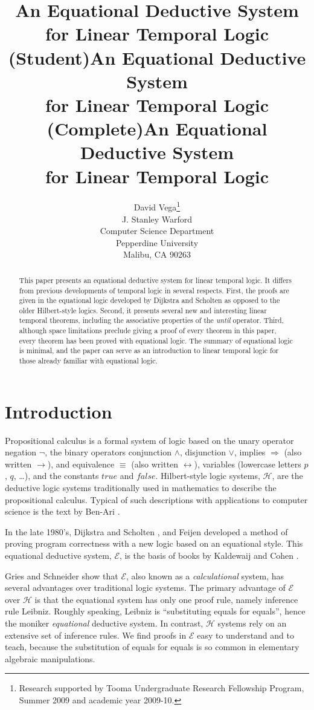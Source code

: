 \documentclass[12pt, fleqn, leqno]{article}
\title{An Equational Deductive System\\for Linear Temporal Logic (Student)}
\title{An Equational Deductive System\\for Linear Temporal Logic (Complete)}
\title{An Equational Deductive System\\for Linear Temporal Logic}
\author{David Vega\thanks{Research supported by Tooma Undergraduate Research Fellowship Program, Summer 2009
        and academic year 2009-10.}\\
   J. Stanley Warford\\
   Computer Science Department\\
   Pepperdine University\\
   Malibu, CA 90263}
\date{} %
\newcommand{\impl}{\ensuremath{\Rightarrow}}        %
\begin{document}
\maketitle
\begin{abstract}
This paper presents an equational deductive system for linear temporal logic.
It differs from previous developments of temporal logic in several respects.
First, the proofs are given in the equational logic developed by Dijkstra and Scholten as opposed to the older Hilbert-style logics.
Second, it presents several new and interesting linear temporal theorems, including the associative
properties of the \textit{until} operator.
Third, although space limitations preclude giving a proof of every theorem in this paper,
every theorem has been proved with equational logic.
The summary of equational logic is minimal, and the paper can serve as an introduction to linear temporal logic for those 
already familiar with equational logic.
\end{abstract}

\thispagestyle{plain}

\section{Introduction}

Propositional calculus is a formal system of logic based on the unary operator negation $\neg$,
the binary operators conjunction $\land$, disjunction $\lor$, implies $\impl$ (also written $\rightarrow$),
and equivalence $\equiv$ (also written $\leftrightarrow$),
variables (lowercase letters $p$, $q$, \dots), and the constants $true$ and $false$.
Hilbert-style logic systems, $\mathcal{H}$, are the deductive logic systems traditionally used in mathematics to describe the propositional calculus.
Typical of such descriptions with applications to computer science is the text by Ben-Ari \cite{Ben}.

In the late 1980's, Dijkstra and Scholten \cite{DandS}, and Feijen \cite{Feij} developed a method of proving program correctness with a new logic based on an equational style.
This equational deductive system, $\mathcal{E}$, is the basis of books by Kaldewaij \cite{Kald} and Cohen \cite{Cohen}.

Gries and Schneider \cite{Gries1995, Gries1995145} show that $\mathcal{E}$, also known as a \textit{calculational} system, has several advantages over traditional logic systems.
The primary advantage of $\mathcal{E}$ over $\mathcal{H}$ is that the equational system has only one proof rule, namely inference rule Leibniz.
Roughly speaking, Leibniz is ``substituting equals for equals'', hence the moniker \textit{equational} deductive system.
In contrast, $\mathcal{H}$ systems rely on an extensive set of inference rules.
We find proofs in $\mathcal{E}$ easy to understand and to teach, because the substitution of equals for equals is so common in elementary algebraic manipulations.
\end{document}
